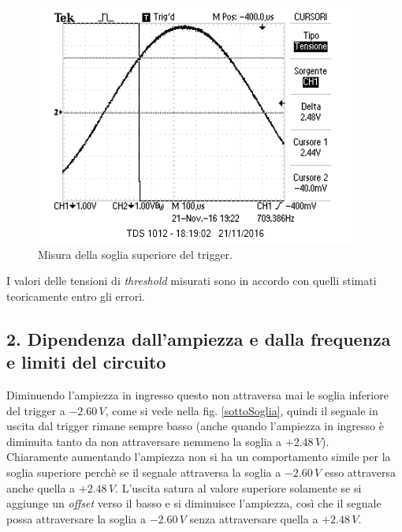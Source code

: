 \documentclass[10pt,a4paper]{article}
\begin{document}
\begin{figure}[h]
\centering
\includegraphics[scale=1.0]{immagini/FotoRicordoVth2.png}
\caption{Misura della soglia superiore del trigger.}
\label{sogliapiu}
\end{figure}

I valori delle tensioni di \emph{threshold} misurati sono in accordo con quelli stimati teoricamente entro gli errori.

\subsection*{2. Dipendenza dall'ampiezza e dalla frequenza e limiti del circuito}

Diminuendo l'ampiezza in ingresso questo non attraversa mai le soglia inferiore del trigger a $-2.60\,V$, come si vede nella fig. \ref{sottoSoglia}, quindi il segnale in uscita dal trigger rimane sempre basso (anche quando l'ampiezza in ingresso è diminuita tanto da non attraversare nemmeno la soglia a $+2.48\,V$).\\
Chiaramente aumentando l'ampiezza non si ha un comportamento simile per la soglia superiore perchè se il segnale attraversa la soglia a $-2.60\,V$ esso attraversa anche quella a $+2.48\,V$. L'uscita satura al valore superiore solamente se si aggiunge un \emph{offset} verso il basso e si diminuisce l'ampiezza, così che il segnale possa attraversare la soglia a $-2.60\,V$ senza attraversare quella a $+2.48\,V$.
\end{document}
